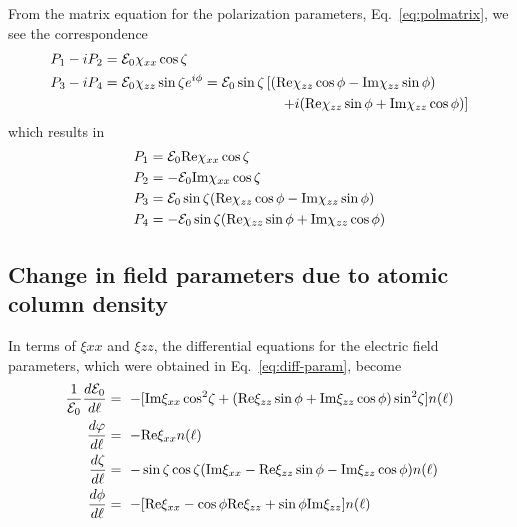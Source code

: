 From the matrix equation for the polarization parameters, 
Eq.~\ref{eq:polmatrix}, we see the correspondence 
\begin{equation}
\begin{split}
  P_{1} - i P_{2} & =  \mathcal{E}_{0} \chi_{xx} \cos\zeta \\
  P_{3} - i P_{4} & =  \mathcal{E}_{0} \chi_{zz} \sin\zeta e^{i\phi} 
        =   \mathcal{E}_{0} \sin\zeta \left[
            (\text{Re}\chi_{zz} \cos\phi - \text{Im}\chi_{zz}\sin\phi ) \right.\\
  & ~~~~~~~~~~~~~~~~~~~~~~~~~~~~~~~~~~~~~~ \left.
          +i(\text{Re}\chi_{zz} \sin\phi + \text{Im}\chi_{zz}\cos\phi ) \right]
\end{split}
\end{equation}
which results in
\begin{equation}
\begin{split}
  P_{1} &=  \mathcal{E}_{0} \text{Re}\chi_{xx} \cos\zeta \\
  P_{2} &= - \mathcal{E}_{0} \text{Im}\chi_{xx} \cos\zeta \\ 
  P_{3} &=  \mathcal{E}_{0} \sin\zeta 
            (\text{Re}\chi_{zz} \cos\phi - \text{Im}\chi_{zz}\sin\phi ) \\ 
  P_{4} &= - \mathcal{E}_{0} \sin\zeta
          (\text{Re}\chi_{zz} \sin\phi + \text{Im}\chi_{zz}\cos\phi ) \\ 
\end{split}
\end{equation}

\vspace{1em}
\subsection{ Change in field parameters due to atomic column density}

In terms of $\xi{xx}$ and $\xi{zz}$, the differential equations for the
electric field parameters, which were obtained in Eq.~\ref{eq:diff-param},
become 
\begin{equation}
\begin{split}
 \frac{1}{\mathcal{E}_{0}} \frac{d \mathcal{E}_{0} }{ d \ell} & = \   
     - [ \text{Im}\xi_{xx} \cos^{2}\!\zeta 
       + (  \text{Re}\xi_{zz} \sin\phi + \text{Im}\xi_{zz}\cos\phi )  
             \sin^{2}\!\zeta ] n(\ell)\\ 
 \frac{ d \varphi }{d \ell} & = \
      -\text{Re}\xi_{xx} n(\ell) \\ 
 \frac{ d \zeta}{ d \ell} & = \ -\sin\zeta\cos\zeta
     ( \text{Im}\xi_{xx}
   - \text{Re}\xi_{zz} \sin\phi - \text{Im}\xi_{zz}\cos\phi ) n(\ell)\\
 \frac{ d \phi}{ d \ell} & = \
     -[ \text{Re}\xi_{xx} - \cos\phi \text{Re}\xi_{zz} 
       + \sin\phi \text{Im}\xi_{zz} ]n(\ell)
\end{split}
\end{equation}

